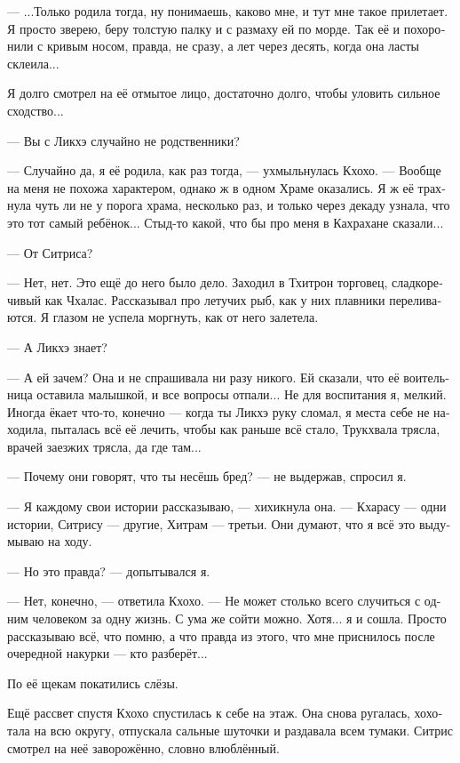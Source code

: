 \documentclass[a4paper,12pt,fleqn]{book}\usepackage{polyglossia}\setdefaultlanguage[babelshorthands=true]{russian}\setotherlanguage{english}\defaultfontfeatures{Ligatures=TeX,Mapping=tex-text}\usepackage{xcolor}\newcommand{\ml}[3]{#2}
\begin{document}
{---  ...Только родила тогда, ну понимаешь, каково мне, и тут мне такое прилетает.
Я просто зверею, беру толстую палку и с размаху ей по морде.
Так её и похоронили с кривым носом, правда, не сразу, а лет через десять, когда она ласты склеила...

Я долго смотрел на её отмытое лицо, достаточно долго, чтобы уловить сильное сходство...

--- Вы с Ликхэ случайно не родственники?

--- Случайно да, я её родила, как раз тогда, --- ухмыльнулась Кхохо.
--- Вообще на меня не похожа характером, однако ж в одном Храме оказались.
Я ж её трахнула чуть ли не у порога храма, несколько раз, и только через декаду узнала, что это тот самый ребёнок...
Стыд-то какой, что бы про меня в Кахрахане сказали...

--- От Ситриса?

--- Нет, нет.
Это ещё до него было дело.
Заходил в Тхитрон торговец, сладкоречивый как Чхалас.
Рассказывал про летучих рыб, как у них плавники переливаются.
Я глазом не успела моргнуть, как от него залетела.

--- А Ликхэ знает?

--- А ей зачем?
Она и не спрашивала ни разу никого.
Ей сказали, что её воительница оставила малышкой, и все вопросы отпали...
Не для воспитания я, мелкий.
Иногда ёкает что-то, конечно --- когда ты Ликхэ руку сломал, я места себе не находила, пыталась всё её лечить, чтобы как раньше всё стало, Трукхвала трясла, врачей заезжих трясла, да где там...

--- Почему они говорят, что ты несёшь бред? --- не выдержав, спросил я.

--- Я каждому свои истории рассказываю, --- хихикнула она.
--- Кхарасу --- одни истории, Ситрису --- другие, Хитрам --- третьи.
Они думают, что я всё это выдумываю на ходу.

--- Но это правда? --- допытывался я.

--- Нет, конечно, --- ответила Кхохо.
--- Не может столько всего случиться с одним человеком за одну жизнь.
С ума же сойти можно.
Хотя... я и сошла.
Просто рассказываю всё, что помню, а что правда из этого, что мне приснилось после очередной накурки --- кто разберёт...

По её щекам покатились слёзы.

Ещё рассвет спустя Кхохо спустилась к себе на этаж.
Она снова ругалась, хохотала на всю округу, отпускала сальные шуточки и раздавала всем тумаки.
Ситрис смотрел на неё заворожённо, словно влюблённый.

}
\end{document}
